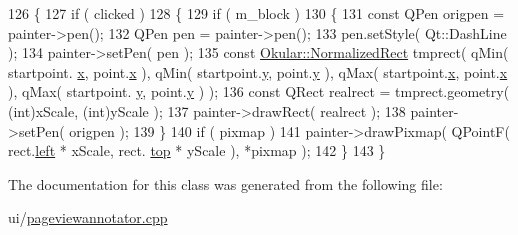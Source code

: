 \begin{DoxyCode}
126         \{
127             \textcolor{keywordflow}{if} ( clicked )
128             \{
129                 \textcolor{keywordflow}{if} ( m\_block )
130                 \{
131                     \textcolor{keyword}{const} QPen origpen = painter->pen();
132                     QPen pen = painter->pen();
133                     pen.setStyle( Qt::DashLine );
134                     painter->setPen( pen );
135                     \textcolor{keyword}{const} \hyperlink{classOkular_1_1NormalizedRect}{Okular::NormalizedRect} tmprect( qMin( startpoint.
      \hyperlink{classOkular_1_1NormalizedPoint_a857f49b9bc7712430d167472ef9dbd94}{x}, point.\hyperlink{classOkular_1_1NormalizedPoint_a857f49b9bc7712430d167472ef9dbd94}{x} ), qMin( startpoint.\hyperlink{classOkular_1_1NormalizedPoint_ac2276daabda627d5f82bb1532c293047}{y}, point.\hyperlink{classOkular_1_1NormalizedPoint_ac2276daabda627d5f82bb1532c293047}{y} ), qMax( startpoint.\hyperlink{classOkular_1_1NormalizedPoint_a857f49b9bc7712430d167472ef9dbd94}{x}, point.\hyperlink{classOkular_1_1NormalizedPoint_a857f49b9bc7712430d167472ef9dbd94}{x} ), qMax( startpoint.
      \hyperlink{classOkular_1_1NormalizedPoint_ac2276daabda627d5f82bb1532c293047}{y}, point.\hyperlink{classOkular_1_1NormalizedPoint_ac2276daabda627d5f82bb1532c293047}{y} ) );
136                     \textcolor{keyword}{const} QRect realrect = tmprect.geometry( (\textcolor{keywordtype}{int})xScale, (\textcolor{keywordtype}{int})yScale );
137                     painter->drawRect( realrect );
138                     painter->setPen( origpen );
139                 \}
140                 \textcolor{keywordflow}{if} ( pixmap )
141                     painter->drawPixmap( QPointF( rect.\hyperlink{classOkular_1_1NormalizedRect_a76336fe9d733f2b559cf8df3ef48f9e7}{left} * xScale, rect.
      \hyperlink{classOkular_1_1NormalizedRect_acfb70f6417c993508d50090b512cb954}{top} * yScale ), *pixmap );
142             \}
143         \}
\end{DoxyCode}


The documentation for this class was generated from the following file\+:\begin{DoxyCompactItemize}
\item 
ui/\hyperlink{pageviewannotator_8cpp}{pageviewannotator.\+cpp}\end{DoxyCompactItemize}
